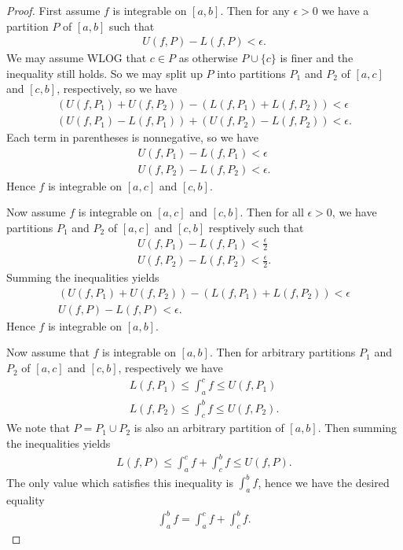 \documentclass[]{article}
\begin{document}
\begin{proof}
		First assume $f$ is integrable on $[a,b]$. Then for any $\epsilon > 0$ we have a partition $P$ of $[a,b]$ such that
		\begin{align*}
				U(f,P) - L(f,P) < \epsilon.
		\end{align*}
		We may assume WLOG that $c \in P$ as otherwise $P \cup \{c\}$ is finer and the inequality still holds. So we may split up $P$ into partitions $P_1 $ and $P_2$ of $[a,c]$ and $[c,b]$, respectively, so we have
		\begin{align*}
				(U(f,P_1) + U(f,P_2)) - (L(f,P_1) + L(f,P_2)) < \epsilon \\
				(U(f,P_1) - L(f,P_1)) + (U(f,P_2) - L(f,P_2)) < \epsilon.
		\end{align*}
		Each term in parentheses is nonnegative, so we have
		\begin{align*}
				U(f,P_1) - L(f,P_1) < \epsilon \\
				U(f,P_2) - L(f,P_2) < \epsilon.
		\end{align*}
		Hence $f$ is integrable on $[a,c]$ and $[c,b]$.

		Now assume $f$ is integrable on $[a,c]$ and $[c,b]$. Then for all $\epsilon > 0$, we have partitions $P_1 $ and $P_2$ of $[a,c]$ and $[c,b]$ resptively such that
		\begin{align*}
			U(f,P_1) - L(f,P_1) < \frac{\epsilon}{2} \\
			U(f,P_2) - L(f,P_2) < \frac{\epsilon}{2}.
		\end{align*}
		Summing the inequalities yields
		\begin{align*}
				(U(f,P_1) + U(f,P_2)) - (L(f,P_1) + L(f,P_2)) < \epsilon \\
				U(f,P) - L(f,P) < \epsilon.
		\end{align*}
		Hence $f$ is integrable on $[a,b]$.

		Now assume that $f$ is integrable on $[a,b]$. Then for arbitrary partitions $P_1$ and $P_2$ of $[a,c]$ and $[c,b]$, respectively we have
		\begin{align*}
				L(f,P_1) \leq \int_a^cf \leq U(f,P_1) \\
				L(f,P_2) \leq \int_c^bf \leq U(f,P_2).
		\end{align*}
		We note that $P = P_1 \cup P_2$ is also an arbitrary partition of $[a,b]$. Then summing the inequalities yields
		\begin{align*}
				L(f,P) \leq \int_a^cf + \int_c^bf \leq U(f,P).
		\end{align*}
		The only value which satisfies this inequality is $\int_a^bf$, hence we have the desired equality
		\begin{align*}
				\int_a^bf = \int_a^cf + \int_c^bf.
		\end{align*}
\end{proof}
\end{document}
